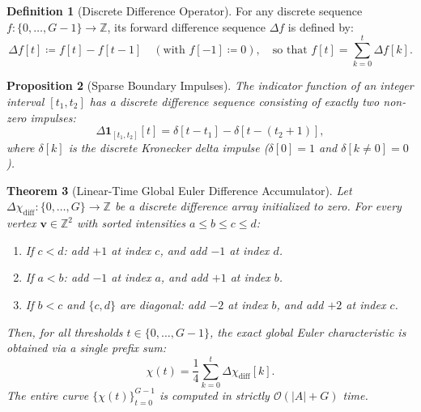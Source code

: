 \documentclass[11pt,a4paper]{article}
\theoremstyle{plain}
\newtheorem{theorem}{Theorem}[section]
\newtheorem{proposition}[theorem]{Proposition}
\theoremstyle{definition}
\newtheorem{definition}[theorem]{Definition}
\theoremstyle{remark}
\newcommand{\Z}{\mathbb{Z}}
\newcommand{\indicator}{\mathbf{1}}
\begin{document}
\begin{definition}[Discrete Difference Operator]
For any discrete sequence $f: \{0, \dots, G-1\} \to \Z$, its forward difference sequence $\Delta f$ is defined by:
\begin{equation}
    \Delta f[t] \coloneqq f[t] - f[t-1] \quad (\text{with } f[-1] \coloneqq 0), \quad \text{so that } f[t] = \sum_{k=0}^t \Delta f[k].
\end{equation}
\end{definition}

\begin{proposition}[Sparse Boundary Impulses]
The indicator function of an integer interval $[t_1, t_2]$ has a discrete difference sequence consisting of exactly two non-zero impulses:
\begin{equation}
    \Delta \indicator_{[t_1, t_2]}[t] = \delta[t - t_1] - \delta[t - (t_2 + 1)],
\end{equation}
where $\delta[k]$ is the discrete Kronecker delta impulse ($\delta[0] = 1$ and $\delta[k \neq 0] = 0$).
\end{proposition}

\begin{theorem}[Linear-Time Global Euler Difference Accumulator]
Let $\Delta \chi_{\text{diff}}: \{0, \dots, G\} \to \Z$ be a discrete difference array initialized to zero. For every vertex $\mathbf{v} \in \Z^2$ with sorted intensities $a \le b \le c \le d$:
\begin{enumerate}
    \item If $c < d$: add $+1$ at index $c$, and add $-1$ at index $d$.
    \item If $a < b$: add $-1$ at index $a$, and add $+1$ at index $b$.
    \item If $b < c$ and $\{c, d\}$ are diagonal: add $-2$ at index $b$, and add $+2$ at index $c$.
\end{enumerate}
Then, for all thresholds $t \in \{0, \dots, G-1\}$, the exact global Euler characteristic is obtained via a single prefix sum:
\begin{equation}
    \chi(t) = \frac{1}{4} \sum_{k=0}^t \Delta \chi_{\text{diff}}[k].
\end{equation}
The entire curve $\{\chi(t)\}_{t=0}^{G-1}$ is computed in strictly $\mathcal{O}(|A| + G)$ time.
\end{theorem}
\end{document}
